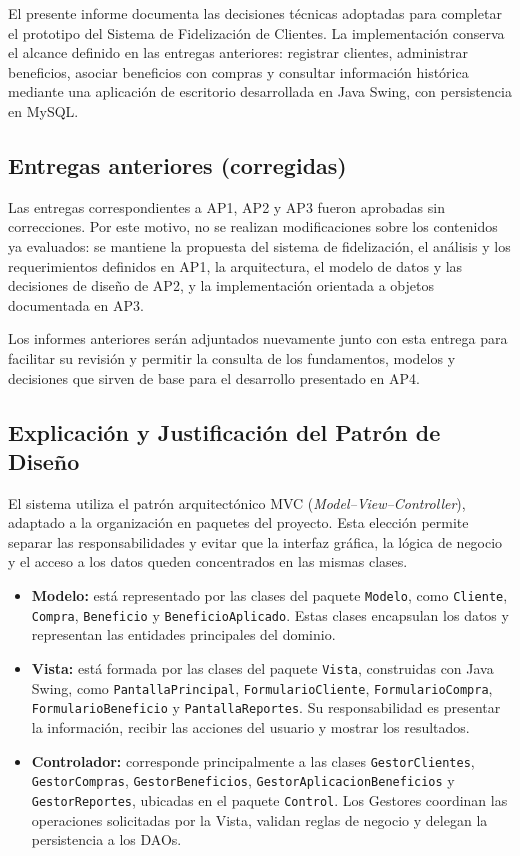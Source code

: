 \documentclass{article}
\begin{document}
El presente informe documenta las decisiones técnicas adoptadas para completar el prototipo del Sistema de Fidelización de Clientes. La implementación conserva el alcance definido en las entregas anteriores: registrar clientes, administrar beneficios, asociar beneficios con compras y consultar información histórica mediante una aplicación de escritorio desarrollada en Java Swing, con persistencia en MySQL.

\subsection{Entregas anteriores (corregidas)}
Las entregas correspondientes a AP1, AP2 y AP3 fueron aprobadas sin correcciones. Por este motivo, no se realizan modificaciones sobre los contenidos ya evaluados: se mantiene la propuesta del sistema de fidelización, el análisis y los requerimientos definidos en AP1, la arquitectura, el modelo de datos y las decisiones de diseño de AP2, y la implementación orientada a objetos documentada en AP3.

Los informes anteriores serán adjuntados nuevamente junto con esta entrega para facilitar su revisión y permitir la consulta de los fundamentos, modelos y decisiones que sirven de base para el desarrollo presentado en AP4.

\subsection{Explicación y Justificación del Patrón de Diseño}
El sistema utiliza el patrón arquitectónico MVC (\textit{Model--View--Controller}), adaptado a la organización en paquetes del proyecto. Esta elección permite separar las responsabilidades y evitar que la interfaz gráfica, la lógica de negocio y el acceso a los datos queden concentrados en las mismas clases.

\begin{itemize}
    \item \textbf{Modelo:} está representado por las clases del paquete \texttt{Modelo}, como \texttt{Cliente}, \texttt{Compra}, \texttt{Beneficio} y \texttt{BeneficioAplicado}. Estas clases encapsulan los datos y representan las entidades principales del dominio.
    \item \textbf{Vista:} está formada por las clases del paquete \texttt{Vista}, construidas con Java Swing, como \texttt{PantallaPrincipal}, \texttt{FormularioCliente}, \texttt{FormularioCompra}, \texttt{FormularioBeneficio} y \texttt{PantallaReportes}. Su responsabilidad es presentar la información, recibir las acciones del usuario y mostrar los resultados.
    \item \textbf{Controlador:} corresponde principalmente a las clases \texttt{GestorClientes}, \texttt{GestorCompras}, \texttt{GestorBeneficios}, \texttt{GestorAplicacionBeneficios} y \texttt{GestorReportes}, ubicadas en el paquete \texttt{Control}. Los Gestores coordinan las operaciones solicitadas por la Vista, validan reglas de negocio y delegan la persistencia a los DAOs.
\end{itemize}
\end{document}
